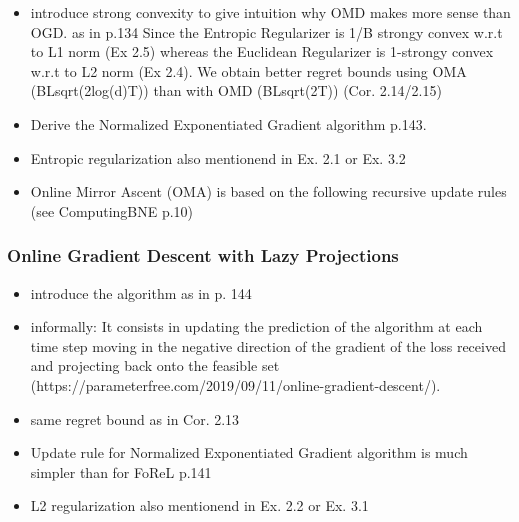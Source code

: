 \begin{itemize}
    \item introduce strong convexity to give intuition why OMD makes more sense
    than OGD. as in \cite{shalev} p.134 Since the Entropic Regularizer is 1/B
    strongy convex w.r.t to L1 norm (Ex 2.5)
    whereas the Euclidean Regularizer is 1-strongy convex w.r.t
    to L2 norm (Ex 2.4). We obtain better regret bounds using OMA
    (BLsqrt(2log(d)T)) than with OMD (BLsqrt(2T)) (Cor. 2.14/2.15)
    \item Derive the Normalized Exponentiated Gradient algorithm \cite{shalev}
    p.143.
    \item Entropic regularization also mentionend in \cite{flokas} Ex. 2.1 or \cite{mertikopoulos} Ex. 3.2
    
    \item Online Mirror Ascent (OMA) is based on the following recursive update rules (see ComputingBNE p.10)
\end{itemize}

\subsubsection{Online Gradient Descent with Lazy Projections}\label{subsubsection:OnlineGradientDescentWithLazyProjections}

\begin{itemize}
    \item introduce the algorithm as in \cite{shalev} p. 144
    \item informally: It consists in updating the prediction of the algorithm at
    each time step moving in the negative direction of the gradient of the loss
    received and projecting back onto the feasible set
    (https://parameterfree.com/2019/09/11/online-gradient-descent/).
    \item same regret bound as in Cor. 2.13
    \item Update rule for Normalized Exponentiated Gradient algorithm is much
    simpler than for FoReL \cite{shalev} p.141
    \item L2 regularization also mentionend in \cite{flokas} Ex. 2.2 or \cite{mertikopoulos} Ex. 3.1
\end{itemize}




